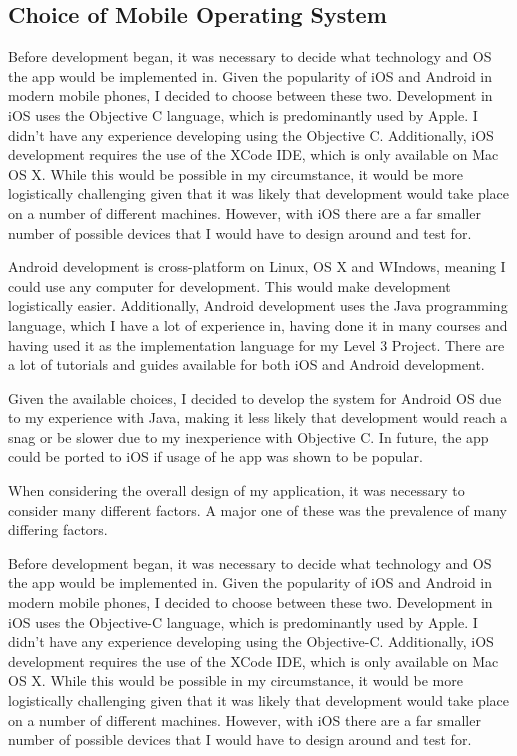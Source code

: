 \documentclass{l4proj}
\begin{document}
\subsection{Choice of Mobile Operating System}

Before development began, it was necessary to decide what technology and OS the app would be implemented in. Given the popularity of iOS and Android in modern mobile phones, I decided to choose between these two. Development in iOS uses the Objective C language, which is predominantly used by Apple. I didn’t have any experience developing using the Objective C. Additionally, iOS development requires the use of the XCode IDE, which is only available on Mac OS X.  While this would be possible in my circumstance, it would be more logistically challenging given that it was likely that development would take place on a number of different machines. However, with iOS there are a far smaller number of possible devices that I would have to design around and test for.

Android development is cross-platform on Linux, OS X and WIndows, meaning I could use any computer for development. This would make development logistically easier. Additionally, Android development uses the Java programming language, which I have a lot of experience in, having done it in many courses and having used it as the implementation language for my Level 3 Project. There are a lot of tutorials and guides available for both iOS and Android development.

Given the available choices, I decided to develop the system for Android OS due to my experience with Java, making it less likely that development would reach a snag or be slower due to my inexperience with Objective C. In future, the app could be ported to iOS if usage of he app was shown to be popular.

When considering the overall design of my application, it was necessary to consider many different factors. A major one of these was the prevalence of many differing factors.

Before development began, it was necessary to decide what technology and OS the app would be implemented in. Given the popularity of iOS and Android in modern mobile phones, I decided to choose between these two. Development in iOS uses the Objective-C language, which is predominantly used by Apple. I didn’t have any experience developing using the Objective-C. Additionally, iOS development requires the use of the XCode IDE, which is only available on Mac OS X.  While this would be possible in my circumstance, it would be more logistically challenging given that it was likely that development would take place on a number of different machines. However, with iOS there are a far smaller number of possible devices that I would have to design around and test for.
\end{document}

